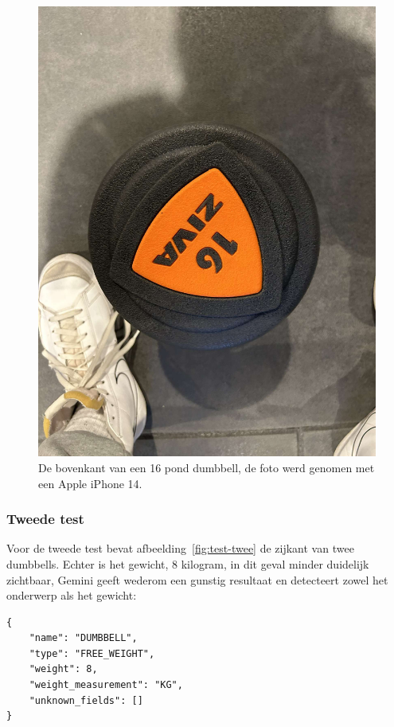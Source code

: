 \begin{figure}[H]
    \begin{center}
        \includegraphics[scale=0.1]{images/prompt1-image}
        \caption{De bovenkant van een 16 pond dumbbell, de foto werd genomen met een Apple iPhone 14.}
        \label{fig:test-een}
    \end{center}
\end{figure}

\subsubsection{Tweede test}
Voor de tweede test bevat afbeelding~\ref{fig:test-twee} de zijkant van twee dumbbells.
Echter is het gewicht, 8 kilogram, in dit geval minder duidelijk zichtbaar,
Gemini geeft wederom een gunstig resultaat en detecteert zowel het onderwerp als het gewicht:
\begin{mdframed}[backgroundcolor=bg]
    \begin{verbatim}
{
    "name": "DUMBBELL",
    "type": "FREE_WEIGHT",
    "weight": 8,
    "weight_measurement": "KG",
    "unknown_fields": []
}
    \end{verbatim}
\end{mdframed}

